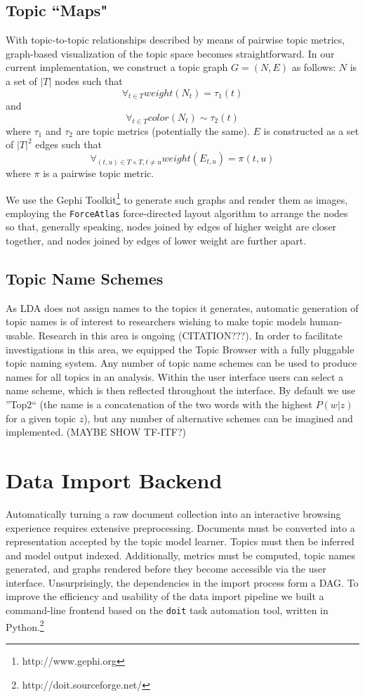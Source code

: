 \documentclass[11pt]{article}
\begin{document}
\subsection{Topic ``Maps"}
With topic-to-topic relationships described by means of pairwise topic metrics,
graph-based visualization of the topic space becomes straightforward. In our
current implementation, we construct a topic graph $G = (N, E)$ as follows:
$N$ is a set of $|T|$ nodes such that
\[\forall_{t\in T} weight(N_{t}) = \tau_{1}(t)\]
and
\[\forall_{t\in T} color(N_{t}) \sim \tau_{2}(t)\]
where $\tau_1$ and $\tau_2$ are topic metrics (potentially the same). $E$ is
constructed as a set of $|T|^2$ edges such that
  \[\forall_{(t,u)\in T\times T, t\neq u} weight(E_{t,u}) = \pi(t,u)\]
where $\pi$ is a pairwise topic metric.

We use the Gephi Toolkit\footnote{http://www.gephi.org} to generate such graphs
and render them as images, employing the \texttt{ForceAtlas} force-directed
layout algorithm to arrange the nodes so that, generally speaking, nodes joined
by edges of higher weight are closer together, and nodes joined by edges of
lower weight are further apart.



\subsection{Topic Name Schemes}
As LDA does not assign names to the topics it generates, automatic generation of
topic names is of interest to researchers wishing to make topic models
human-usable. Research in this area is ongoing (CITATION???). In order to
facilitate investigations in this area, we equipped the Topic Browser with a
fully pluggable topic naming system. Any number of topic name schemes can be
used to produce names for all topics in an analysis. Within the user interface
users can select a name scheme, which is then reflected throughout the
interface. By default we use ''Top2`` (the name is a concatenation of the two
words with the highest $P(w|z)$ for a given topic $z$), but any number of
alternative schemes can be imagined and implemented. (MAYBE SHOW TF-ITF?)

\section{Data Import Backend}
Automatically turning a raw document collection into an interactive browsing
experience requires extensive preprocessing. Documents must be converted into a
representation accepted by the topic model learner. Topics must then be inferred
and model output indexed. Additionally, metrics must be computed, topic names
generated, and graphs rendered before they become accessible via the user
interface. Unsurprisingly, the dependencies in the import process form a DAG. To
improve the efficiency and usability of the data import pipeline we built a
command-line frontend based on the \verb/doit/ task automation tool, written in
Python.\footnote{http://doit.sourceforge.net/}
\end{document}

